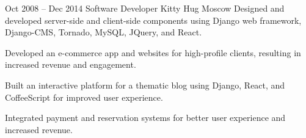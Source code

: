 \cventry
  {Oct 2008 – Dec 2014}
  {Software Developer}
  {Kitty Hug}
  {Moscow}
  {}
  {Designed and developed server-side and client-side components using Django web framework, Django-CMS, Tornado, MySQL, JQuery, and React.}

\cvlistitem
  {Developed an e-commerce app and websites for high-profile clients, resulting in increased revenue and engagement.}

\cvlistitem
  {Built an interactive platform for a thematic blog using Django, React, and CoffeeScript for improved user experience.}

\cvlistitem
  {Integrated payment and reservation systems for better user experience and increased revenue.}
